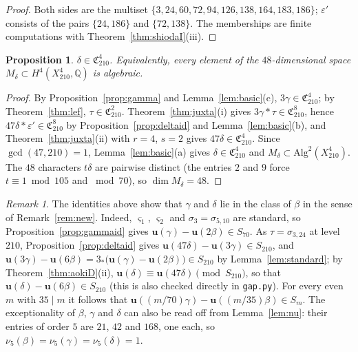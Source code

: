 \documentclass[11pt]{amsart}
\newtheorem{proposition}[theorem]{Proposition}
\theoremstyle{definition}
\theoremstyle{remark}
\newtheorem{remark}[theorem]{Remark}
\numberwithin{equation}{section}
\newcommand{\Q}{\mathbb{Q}}
\newcommand{\fC}{\mathfrak{C}}
\newcommand{\uu}{\mathbf{u}}
\begin{document}
\begin{proof}
Both sides are the multiset $\{3,24,60,72,94,126,138,164,183,186\}$; $\varepsilon'$ consists of the pairs $\{24,186\}$ and $\{72,138\}$. The memberships are finite computations with Theorem~\ref{thm:shiodaI}(iii).
\end{proof}

\begin{proposition}\label{prop:delta}
$\delta\in\fC^4_{210}$. Equivalently, every element of the $48$-dimensional space $M_\delta\subset H^4(X^4_{210},\Q)$ is algebraic.
\end{proposition}

\begin{proof}
By Proposition~\ref{prop:gamma} and Lemma~\ref{lem:basic}(c), $3\gamma\in\fC^4_{210}$; by Theorem~\ref{thm:lef}, $\tau\in\fC^2_{210}$. Theorem~\ref{thm:juxta}(i) gives $3\gamma*\tau\in\fC^8_{210}$, hence $47\delta*\varepsilon'\in\fC^8_{210}$ by Proposition~\ref{prop:deltaid} and Lemma~\ref{lem:basic}(b), and Theorem~\ref{thm:juxta}(ii) with $r=4$, $s=2$ gives $47\delta\in\fC^4_{210}$. Since $\gcd(47,210)=1$, Lemma~\ref{lem:basic}(a) gives $\delta\in\fC^4_{210}$ and $M_\delta\subset\mathrm{Alg}^2(X^4_{210})$. The $48$ characters $t\delta$ are pairwise distinct (the entries $2$ and $9$ force $t\equiv1\bmod 105$ and $\bmod 70$), so $\dim M_\delta=48$.
\end{proof}

\begin{remark}\label{rem:gammadelta}
The identities above show that $\gamma$ and $\delta$ lie in the class of $\beta$ in the sense of Remark~\ref{rem:new}. Indeed, $\varsigma_1$, $\varsigma_2$ and $\sigma_3=\sigma_{5,10}$ are standard, so Proposition~\ref{prop:gammaid} gives $\uu(\gamma)-\uu(2\beta)\in S_{70}$. As $\tau=\sigma_{3,24}$ at level $210$, Proposition~\ref{prop:deltaid} gives $\uu(47\delta)-\uu(3\gamma)\in S_{210}$, and $\uu(3\gamma)-\uu(6\beta)=3_*\bigl(\uu(\gamma)-\uu(2\beta)\bigr)\in S_{210}$ by Lemma~\ref{lem:standard}; by Theorem~\ref{thm:aokiD}(ii), $\uu(\delta)\equiv\uu(47\delta)\pmod{S_{210}}$, so that $\uu(\delta)-\uu(6\beta)\in S_{210}$ (this is also checked directly in \texttt{gap.py}). For every even $m$ with $35\mid m$ it follows that $\uu((m/70)\gamma)-\uu((m/35)\beta)\in S_m$. The exceptionality of $\beta$, $\gamma$ and $\delta$ can also be read off from Lemma~\ref{lem:nu}: their entries of order $5$ are $21$, $42$ and $168$, one each, so $\nu_5(\beta)=\nu_5(\gamma)=\nu_5(\delta)=1$.
\end{remark}
\end{document}
